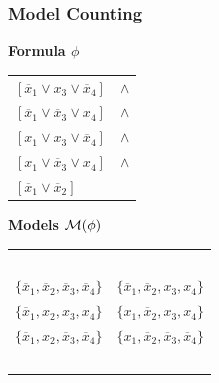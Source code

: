 \documentclass[t,pdf]{beamer}
\newcommand{\opos}[1]{#1}
\newcommand{\oneg}[1]{\overline{#1}}
\begin{document}
\begin{frame}
  \frametitle{Model Counting}

\medskip
\begin{minipage}{0.49\textwidth}
\begin{center}
  {\bf Formula $\phi$}\\[0.25em]
  \begin{tabular}{lc}
    $[\oneg{x}_1 \lor \opos{x}_3 \lor \oneg{x}_4]$ & $\land$ \\
    $[\oneg{x}_1 \lor \oneg{x}_3 \lor \opos{x}_4]$ & $\land$ \\
    $[\opos{x}_1 \lor \opos{x}_3 \lor \oneg{x}_4]$ & $\land$ \\
    $[\opos{x}_1 \lor \oneg{x}_3 \lor \opos{x}_4]$ & $\land$ \\
    $[\oneg{x}_1 \lor \oneg{x}_2]$ &  \\
  \end{tabular}
\end{center}
\end{minipage}
\begin{minipage}{0.49\textwidth}
\begin{center}
  {\bf Models ${\cal M}(\phi)$}\\[0.25em]
  \begin{tabular}{cc}
    $\;$\\
    $\{ \oneg{x}_1, \oneg{x}_2, \oneg{x}_3, \oneg{x}_4 \}$ &
    $\{ \oneg{x}_1, \oneg{x}_2, \opos{x}_3, \opos{x}_4 \}$ \\
    $\{ \oneg{x}_1, \opos{x}_2, \opos{x}_3, \opos{x}_4 \}$ &
    $\{ \opos{x}_1, \oneg{x}_2, \opos{x}_3, \opos{x}_4 \}$ \\
    $\{ \oneg{x}_1, \opos{x}_2, \oneg{x}_3, \oneg{x}_4 \}$ &
    $\{ \opos{x}_1, \oneg{x}_2, \oneg{x}_3, \oneg{x}_4 \}$ \\
    $\;$\\
  \end{tabular}
\end{center}
\end{minipage}


\end{frame}
\end{document}
